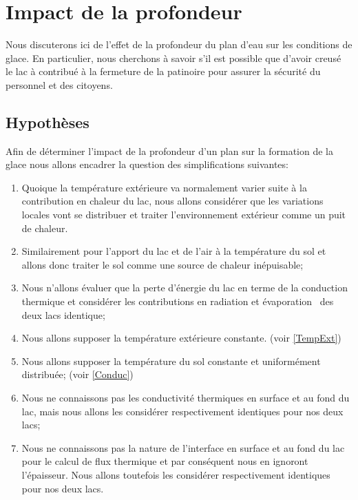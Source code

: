 \documentclass[12pt]{article}
\numberwithin{figure}{section}
\begin{document}
\section{Impact de la profondeur}

Nous discuterons ici de l'effet de la profondeur du plan d'eau sur les conditions de glace. En
particulier, nous cherchons \`a savoir s'il est possible que d'avoir creus\'e~\cite{Lac} le lac \`a
contribu\'e \`a la fermeture de la patinoire pour assurer la s\'ecurit\'e du personnel et des
citoyens.

\subsection{Hypoth\`eses}

Afin de d\'eterminer l'impact de la profondeur d'un plan sur la formation de la glace nous allons
encadrer la question des simplifications suivantes:

\begin{enumerate}
    \item Quoique la temp\'erature ext\'erieure va normalement varier suite \`a la contribution
        en chaleur du lac, nous allons consid\'erer que les variations locales vont se distribuer
        et traiter l'environnement ext\'erieur comme un puit de chaleur.
    \item Similairement pour l'apport du lac et de l'air \`a la temp\'erature du sol et allons
        donc traiter le sol comme une source de chaleur in\'epuisable;
    \item Nous n'allons \'evaluer que la perte d'\'energie du lac en terme de la conduction thermique
        et consid\'erer les contributions en radiation et \'evaporation~\cite{Evap} des deux lacs
        identique;
    \item Nous allons supposer la temp\'erature ext\'erieure constante. (voir \ref{TempExt})
    \item Nous allons supposer la temp\'erature du sol constante et uniform\'ement distribu\'ee;
        (voir \ref{Conduc})
    \item Nous ne connaissons pas les conductivit\'e thermiques en surface et au fond du lac, mais
        nous allons les consid\'erer respectivement identiques pour nos deux lacs;
    \item Nous ne connaissons pas la nature de l'interface en surface et au fond du lac pour le
        calcul de flux thermique et par cons\'equent nous en ignoront l'\'epaisseur. Nous allons
        toutefois les consid\'erer respectivement identiques pour nos deux lacs.
\end{enumerate}
\end{document}

